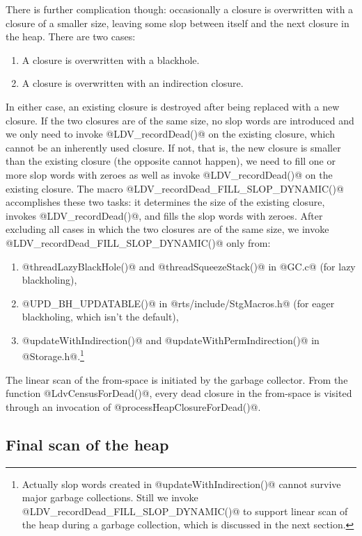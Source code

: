 \documentclass{article}
\begin{document}
There is further complication though: occasionally a closure is
overwritten with a closure of a smaller size, leaving some slop
between itself and the next closure in the heap.  There are two cases:

\begin{enumerate}
\item A closure is overwritten with a blackhole. 
\item A closure is overwritten with an indirection closure.
\end{enumerate}

In either case, an existing closure is destroyed after being replaced
with a new closure.  If the two closures are of the same size, no slop
words are introduced and we only need to invoke @LDV_recordDead()@ on
the existing closure, which cannot be an inherently used closure.  If
not, that is, the new closure is smaller than the existing closure
(the opposite cannot happen), we need to fill one or more slop words
with zeroes as well as invoke @LDV_recordDead()@ on the existing
closure.  The macro @LDV_recordDead_FILL_SLOP_DYNAMIC()@ accomplishes
these two tasks: it determines the size of the existing closure,
invokes @LDV_recordDead()@, and fills the slop words with zeroes.
After excluding all cases in which the two closures are of the same
size, we invoke @LDV_recordDead_FILL_SLOP_DYNAMIC()@ only from:

\begin{enumerate}
\item @threadLazyBlackHole()@ and @threadSqueezeStack()@ in @GC.c@
(for lazy blackholing),
\item @UPD_BH_UPDATABLE()@ in
@rts/include/StgMacros.h@ (for eager blackholing, which isn't the
default),
\item @updateWithIndirection()@ and @updateWithPermIndirection()@ 
in @Storage.h@.\footnote{Actually slop words created in 
@updateWithIndirection()@ cannot survive major garbage collections.
Still we invoke @LDV\_recordDead\_FILL\_SLOP\_DYNAMIC()@ to support linear
scan of the heap during a garbage collection, which is discussed in the next
section.}
\end{enumerate}

The linear scan of the from-space is initiated by the garbage
collector.  From the function @LdvCensusForDead()@, every dead closure
in the from-space is visited through an invocation of
@processHeapClosureForDead()@.

\subsection{Final scan of the heap}
\end{document}
